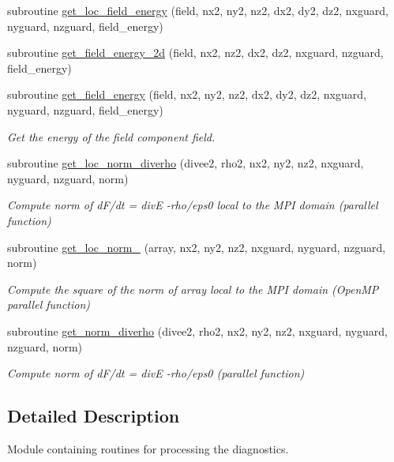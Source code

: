 \begin{DoxyCompactItemize}
subroutine \hyperlink{namespacediagnostics_a00b7e2217883d1cfe260ccc24e740663}{get\+\_\+loc\+\_\+field\+\_\+energy} (field, nx2, ny2, nz2, dx2, dy2, dz2, nxguard, nyguard, nzguard, field\+\_\+energy)
\item 
subroutine \hyperlink{namespacediagnostics_a35743d1121d2d5381a758ad94085362e}{get\+\_\+field\+\_\+energy\+\_\+2d} (field, nx2, nz2, dx2, dz2, nxguard, nzguard, field\+\_\+energy)
\item 
subroutine \hyperlink{namespacediagnostics_ac039b5b8f68cf780a761ee735024fe56}{get\+\_\+field\+\_\+energy} (field, nx2, ny2, nz2, dx2, dy2, dz2, nxguard, nyguard, nzguard, field\+\_\+energy)
\begin{DoxyCompactList}\small\item\em Get the energy of the field component field. \end{DoxyCompactList}\item 
subroutine \hyperlink{namespacediagnostics_a0c81a0eb062f6137922f5a857c51e684}{get\+\_\+loc\+\_\+norm\+\_\+diverho} (divee2, rho2, nx2, ny2, nz2, nxguard, nyguard, nzguard, norm)
\begin{DoxyCompactList}\small\item\em Compute norm of d\+F/dt = divE -\/rho/eps0 local to the M\+PI domain (parallel function) \end{DoxyCompactList}\item 
subroutine \hyperlink{namespacediagnostics_a64b59a6d54ed382f0cdfc360a5ccea39}{get\+\_\+loc\+\_\+norm\+\_} (array, nx2, ny2, nz2, nxguard, nyguard, nzguard, norm)
\begin{DoxyCompactList}\small\item\em Compute the square of the norm of array local to the M\+PI domain (Open\+MP parallel function) \end{DoxyCompactList}\item 
subroutine \hyperlink{namespacediagnostics_a39c7463e667e97124ccb0c85381e6d03}{get\+\_\+norm\+\_\+diverho} (divee2, rho2, nx2, ny2, nz2, nxguard, nyguard, nzguard, norm)
\begin{DoxyCompactList}\small\item\em Compute norm of d\+F/dt = divE -\/rho/eps0 (parallel function) \end{DoxyCompactList}\end{DoxyCompactItemize}


\subsection{Detailed Description}
Module containing routines for processing the diagnostics. 

